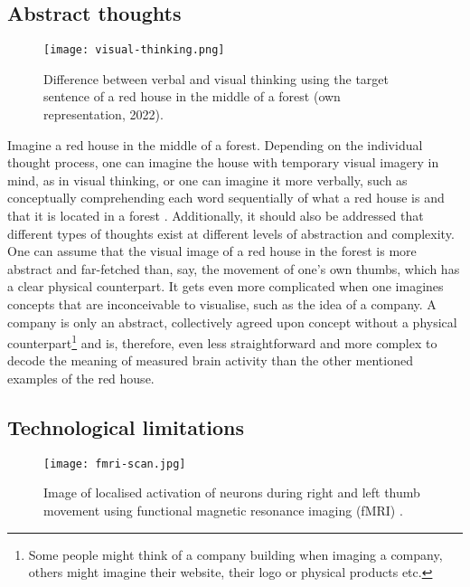 \subsection{Abstract thoughts}
\label{chapter2-abstract-thoughts}

\begin{figure}[ht]
  \centering
  \texttt{[image: visual-thinking.png]}
  \caption{Difference between verbal and visual thinking using the target sentence of a red house in the middle of a forest (own representation, 2022).}
  \label{fig:visual-thinking}
\end{figure}

Imagine a red house in the middle of a forest. Depending on the individual thought process, one can imagine the house with temporary visual imagery in mind, as in visual thinking, or one can imagine it more verbally, such as conceptually comprehending each word sequentially of what a red house is and that it is located in a forest \citep{amit_asymmetrical_2017}. Additionally, it should also be addressed that different types of thoughts exist at different levels of abstraction and complexity. One can assume that the visual image of a red house in the forest is more abstract and far-fetched than, say, the movement of one's own thumbs, which has a clear physical counterpart. It gets even more complicated when one imagines concepts that are inconceivable to visualise, such as the idea of a company. A company is only an abstract, collectively agreed upon concept without a physical counterpart\footnote{Some people might think of a company building when imaging a company, others might imagine their website, their logo or physical products etc.} and is, therefore, even less straightforward and more complex to decode the meaning of measured brain activity than the other mentioned examples of the red house.

\subsection{Technological limitations}
\label{chapter2-technological-limitations}

\begin{figure}[ht]
  \centering
  \texttt{[image: fmri-scan.jpg]}
  \caption{Image of localised activation of neurons during right and left thumb movement using functional magnetic resonance imaging (fMRI) \citep{rashid_bilateral_2018}.}
  \label{fig:fmri-scan}
\end{figure}


